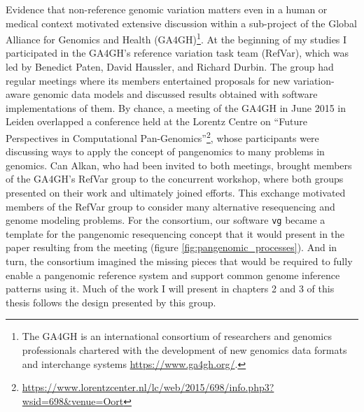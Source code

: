 \documentclass[a4paper,12pt,numbered,oneside]{Classes/PhDThesisPSnPDF}
\begin{document}
Evidence that non-reference genomic variation matters even in a human or medical context motivated extensive discussion within a sub-project of the Global Alliance for Genomics and Health (GA4GH)\footnote{The GA4GH is an international consortium of researchers and genomics professionals chartered with the development of new genomics data formats and interchange systems \url{https://www.ga4gh.org/}.}.
At the beginning of my studies I participated in the GA4GH's reference variation task team (RefVar), which was led by Benedict Paten, David Haussler, and Richard Durbin.
The group had regular meetings where its members entertained proposals for new variation-aware genomic data models and discussed results obtained with software implementations of them.
By chance, a meeting of the GA4GH in June 2015 in Leiden overlapped a conference held at the Lorentz Centre on ``Future Perspectives in Computational Pan-Genomics''\footnote{\url{https://www.lorentzcenter.nl/lc/web/2015/698/info.php3?wsid=698\&venue=Oort}}, whose participants were discussing ways to apply the concept of pangenomics to many problems in genomics.
Can Alkan, who had been invited to both meetings, brought members of the GA4GH's RefVar group to the concurrent workshop, where both groups presented on their work and ultimately joined efforts.
This exchange motivated members of the RefVar group to consider many alternative resequencing and genome modeling problems.
For the consortium, our software {\tt vg} became a template for the pangenomic resequencing concept that it would present in the paper resulting from the meeting \cite{computational2016computational} (figure \ref{fig:pangenomic_processes}).
And in turn, the consortium imagined the missing pieces that would be required to fully enable a pangenomic reference system and support common genome inference patterns using it.
Much of the work I will present in chapters 2 and 3 of this thesis follows the design presented by this group.
\end{document}
